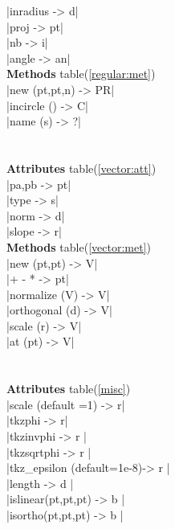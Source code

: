 \documentclass[DIV         = 14,
               fontsize    = 10,
               index       = totoc,
               twoside,
               cadre,
               headings    = small
               ]{tkz-doc}
\begin{document}
\begin{multicols}{3}
|inradius                  -> d|   \\
|proj                      -> pt|  \\
|nb                        -> i|   \\
|angle                     -> an|  \\
 \textbf{Methods} table(\ref{regular:met})\\
|new (pt,pt,n)             -> PR|  \\
|incircle ()               -> C|   \\
|name (s)                  -> ?|   \\
                                   \\
             \\
\textbf{Attributes} table(\ref{vector:att})   \\
|pa,pb                     -> pt|   \\
|type                      -> s|   \\
|norm                      -> d|   \\
|slope                     -> r|   \\
\textbf{Methods} table(\ref{vector:met})\\
|new (pt,pt)               -> V|   \\
|+ - *                     -> pt|  \\
|normalize (V)             -> V|   \\
|orthogonal (d)            -> V|   \\
|scale (r)                 -> V|   \\
|at (pt)                   -> V|   \\
                                   \\                                  
              \\
 \textbf{Attributes} table(\ref{misc}) \\
|scale (default =1)        -> r|   \\ 
|tkzphi                    -> r|   \\
|tkzinvphi                 -> r |  \\
|tkzsqrtphi                -> r |  \\
|tkz_epsilon (default=1e-8)-> r |  \\
|length                    -> d |  \\
|islinear(pt,pt,pt)        -> b |  \\
|isortho(pt,pt,pt)         -> b |  \\

\end{multicols}
\end{document}
